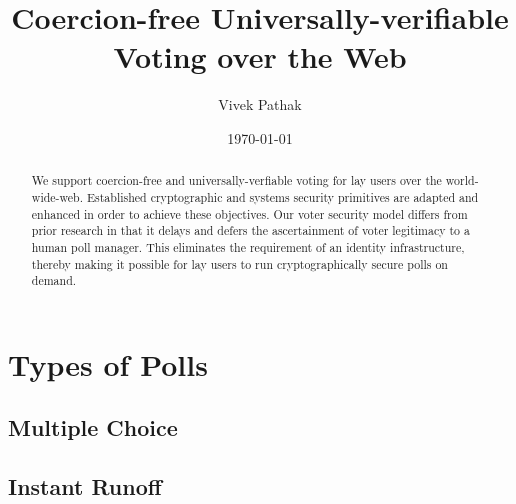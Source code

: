 \documentclass[12pt,draft]{article}
\title{ {\bf  Coercion-free Universally-verifiable Voting over the Web} }
\author{Vivek Pathak}
\date{\today}
\begin{document}
\maketitle

\begin{abstract}
  We support  coercion-free
  and universally-verfiable voting for lay users over the world-wide-web.
  Established cryptographic and systems
  security primitives are adapted and enhanced in order to
  achieve these objectives. 
  Our voter security model differs from prior research in that it delays and
  defers
  the ascertainment of voter legitimacy to a human poll manager.
  This eliminates the requirement of an identity infrastructure,
  thereby making it possible
  for lay users to run cryptographically secure polls on demand.
\end{abstract}

 





\section{Types of Polls}
\subsection{Multiple Choice}
\subsection{Instant Runoff}







\end{document}
